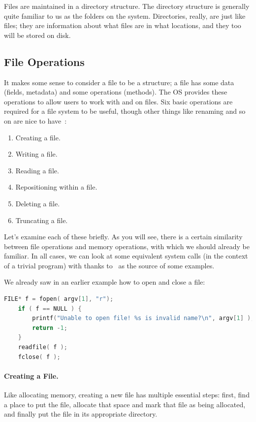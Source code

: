 \documentclass[a4paper]{report}
\begin{document}
Files are maintained in a directory structure. The directory structure is generally quite familiar to us as the folders on the system. Directories, really, are just like files; they are information about what files are in what locations, and they too will be stored on disk.

\subsection*{File Operations}
It makes some sense to consider a file to be a structure; a file has some data (fields, metadata) and some operations (methods). The OS provides these operations to allow users to work with and on files. Six basic operations are required for a file system to be useful, though other things like renaming and so on are nice to have~\cite{osc}:

\begin{enumerate}
	\item Creating a file.
	\item Writing a file.
	\item Reading a file.
	\item Repositioning within a file.
	\item Deleting a file.
	\item Truncating a file.
\end{enumerate}

Let's examine each of these briefly. As you will see, there is a certain similarity between file operations and memory operations, with which we should already be familiar. In all cases, we can look at some equivalent system calls (in the context of a trivial program) with thanks to~\cite{cfiles} as the source of some examples.

We already saw in an earlier example how to open and close a file:
\begin{lstlisting}[language=C]
    FILE* f = fopen( argv[1], "r");
    if ( f == NULL ) {
        printf("Unable to open file! %s is invalid name?\n", argv[1] );
        return -1;
    }
    readfile( f );
    fclose( f );
\end{lstlisting}

\paragraph{Creating a File.} Like allocating memory, creating a new file has multiple essential steps: first, find a place to put the file, allocate that space and mark that file as being allocated, and finally put the file in its appropriate directory.
\end{document}
